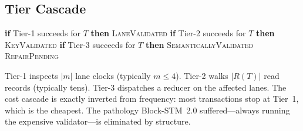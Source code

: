 \subsection{Tier Cascade}

\begin{algorithm}[H]
\caption{Validate transaction $T$}
\label{alg:validate}
\begin{algorithmic}[1]
\State \textbf{if} Tier-1 succeeds for $T$ \textbf{then} \Return
       \textsc{LaneValidated}
\State \textbf{if} Tier-2 succeeds for $T$ \textbf{then} \Return
       \textsc{KeyValidated}
\State \textbf{if} Tier-3 succeeds for $T$ \textbf{then} \Return
       \textsc{SemanticallyValidated}
\State \Return \textsc{RepairPending}
\end{algorithmic}
\end{algorithm}

\begin{remark}
\label{rem:tier-cost}
Tier-1 inspects $|m|$ lane clocks (typically $m \leq 4$). Tier-2
walks $|R(T)|$ read records (typically tens). Tier-3 dispatches a
reducer on the affected lanes. The cost cascade is exactly inverted
from frequency: most transactions stop at Tier~1, which is the
cheapest. The pathology Block-STM~2.0 suffered---always running the
expensive validator---is eliminated by structure.
\end{remark}


